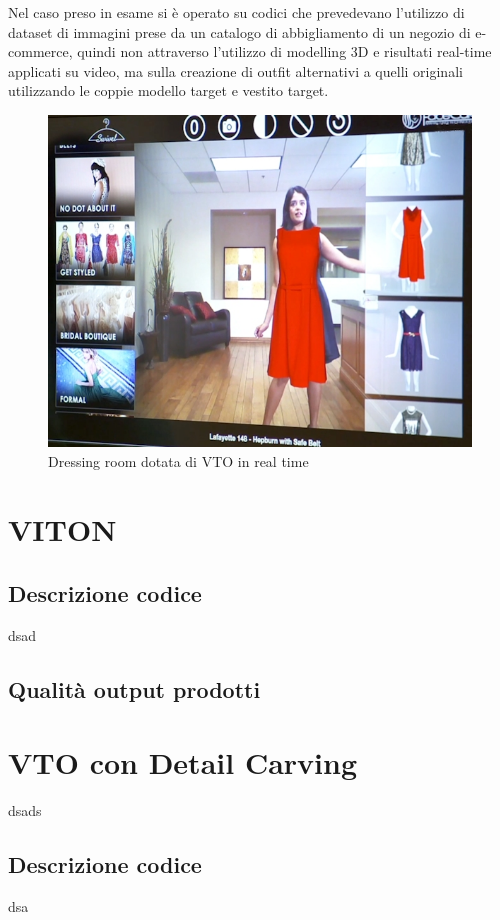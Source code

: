 \documentclass[final, 11pt]{article}
\begin{document}
	Nel caso preso in esame si è operato su codici che prevedevano l'utilizzo di dataset di immagini prese da
un catalogo di abbigliamento di un negozio di e-commerce, quindi non attraverso l'utilizzo di modelling 3D e risultati real-time applicati su video, ma sulla creazione di outfit alternativi a quelli originali utilizzando le coppie modello target e vestito target.
	
	\begin{figure}[!htb]
		\begin{center}
			\includegraphics[scale=.7]{FaceCake-virtual-dressing-room.jpg}
		\end{center} \caption{Dressing room dotata di VTO in real time}
	\end{figure} 

	\section{VITON}
	\subsection{Descrizione codice}
	dsad
	\subsection{Qualità output prodotti}
	
	\newpage
	\section{VTO con Detail Carving}
	dsads
	\subsection{Descrizione codice}	
	dsa
\end{document}

